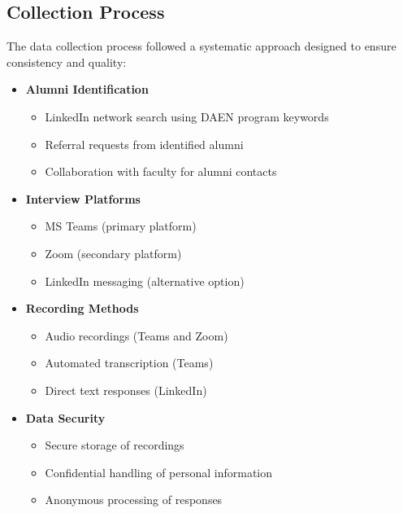\documentclass[12pt,a4paper]{article}
\begin{document}
\subsection{Collection Process}
The data collection process followed a systematic approach designed to ensure consistency and quality:
\begin{itemize}
\item \textbf{Alumni Identification}
\begin{itemize}
\item LinkedIn network search using DAEN program keywords
\item Referral requests from identified alumni
\item Collaboration with faculty for alumni contacts
\end{itemize}
\item \textbf{Interview Platforms}
\begin{itemize}
\item MS Teams (primary platform)
\item Zoom (secondary platform)
\item LinkedIn messaging (alternative option)
\end{itemize}

\item \textbf{Recording Methods}
\begin{itemize}
\item Audio recordings (Teams and Zoom)
\item Automated transcription (Teams)
\item Direct text responses (LinkedIn)
\end{itemize}

\item \textbf{Data Security}
\begin{itemize}
\item Secure storage of recordings
\item Confidential handling of personal information
\item Anonymous processing of responses
\end{itemize}
\end{itemize}
\end{document}
